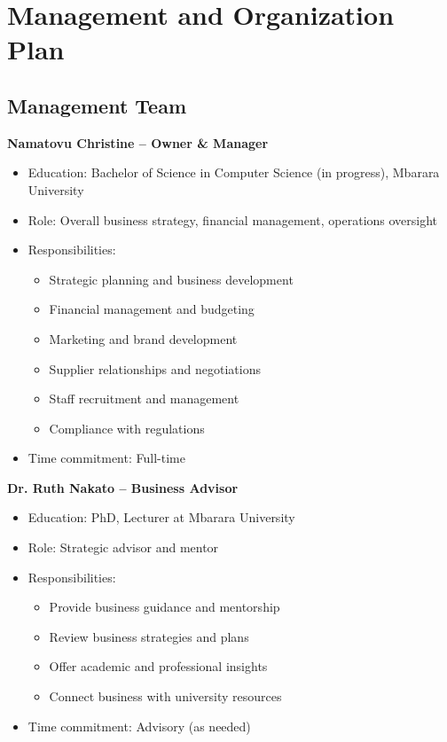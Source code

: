 \section{Management and Organization Plan}

\subsection{Management Team}

\textbf{Namatovu Christine -- Owner \& Manager}
\begin{itemize}[leftmargin=2em]
    \item Education: Bachelor of Science in Computer Science (in progress), Mbarara University
    \item Role: Overall business strategy, financial management, operations oversight
    \item Responsibilities:
    \begin{itemize}
        \item Strategic planning and business development
        \item Financial management and budgeting
        \item Marketing and brand development
        \item Supplier relationships and negotiations
        \item Staff recruitment and management
        \item Compliance with regulations
    \end{itemize}
    \item Time commitment: Full-time
\end{itemize}

\textbf{Dr. Ruth Nakato -- Business Advisor}
\begin{itemize}[leftmargin=2em]
    \item Education: PhD, Lecturer at Mbarara University
    \item Role: Strategic advisor and mentor
    \item Responsibilities:
    \begin{itemize}
        \item Provide business guidance and mentorship
        \item Review business strategies and plans
        \item Offer academic and professional insights
        \item Connect business with university resources
    \end{itemize}
    \item Time commitment: Advisory (as needed)
\end{itemize}

